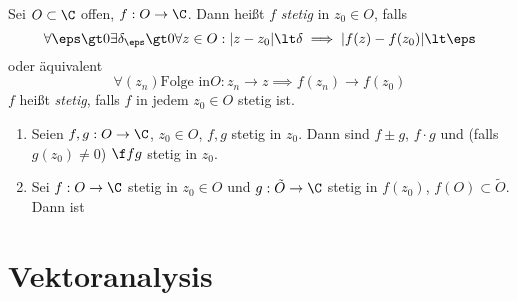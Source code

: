 \documentclass[a4paper,10pt]{scrartcl}
\begin{document}
\begin{df}
	\label{df:1.9}
	Sei $O\subset \C$ offen, $f: O \to \C$.
	Dann heißt $f$ \emph{stetig} in $z_0\in O$, falls
	\[
		\forall \eps\gt 0 \exists \delta_\eps \gt 0 \forall z\in O : |z-z_0| \lt \delta \implies |f(z) -f(z_0)| \lt \eps
	\]
	oder äquivalent
	\[
		\forall (z_n) \text{Folge in} O: z_n \to z \implies f(z_n) \to f(z_0)
	\]
	$f$ heißt \emph{stetig}, falls $f$ in jedem $z_0\in O$ stetig ist.
\end{df}

\begin{st}
	\label{st:1.10}
	\begin{enumerate}
		\item 
			Seien $f,g: O\to \C$, $z_0\in O$, $f,g$ stetig in $z_0$.
			Dann sind $f\pm g$, $f\cdot g$ und (falls $g(z_0)\neq 0$) $\f fg$ stetig in $z_0$.
		\item
			Sei $f:O\to \C$ stetig in $z_0\in O$ und $g:\tilde O \to \C$ stetig in $f(z_0)$, $f(O) \subset \tilde O$.
			Dann ist
	\end{enumerate}
\end{st}


\section{Vektoranalysis}
\end{document}
